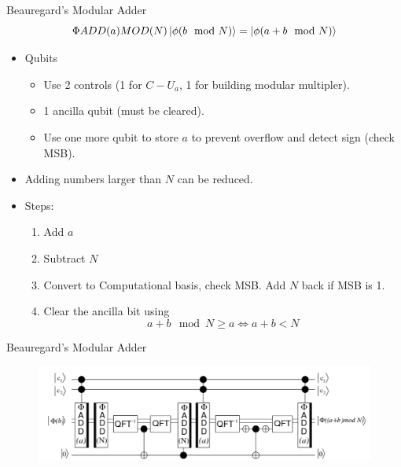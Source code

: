 \documentclass{beamer}
\begin{document}
\begin{frame}{Beauregard's Modular Adder}
	\begin{equation*}
		\Phi ADD(a)MOD(N) \ket{\phi(b \mod N)} = \ket{\phi (a+b \mod N)}
	\end{equation*}
	
	\begin{itemize}
		\item Qubits
		\begin{itemize}
			\item Use 2 controls (1 for $C-U_a$, 1 for building modular multipler).
			\item 1 ancilla qubit (must be cleared).
			\item Use one more qubit to store $a$ to prevent overflow and detect
				sign (check MSB).
		\end{itemize}
		\item Adding numbers larger than $N$ can be reduced.
		\item Steps:
		\begin{enumerate}
			\item Add $a$
			\item Subtract $N$
			\item Convert to Computational basis, check MSB. Add $N$ back if
				MSB is 1.
			\item Clear the ancilla bit using
				\begin{equation*}
					a+b\mod N \geq a \Longleftrightarrow a+b < N
				\end{equation*}
				
		\end{enumerate}
	\end{itemize}
	
\end{frame}

\begin{frame}{Beauregard's Modular Adder}
	\begin{figure}[h]
		\centering
		\includegraphics[width=\linewidth]{./beauregard_adder.png}
	\end{figure}
\end{frame}
\end{document}
